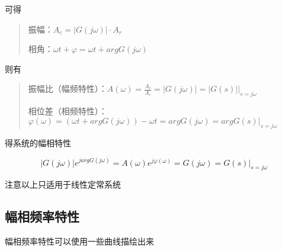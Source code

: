 \documentclass[lang=cn,10pt]{elegantbook}
\begin{document}
可得

\begin{quote}

	\indent 振幅：$A_c=|G(j\omega)|\cdot A_r$

	\indent 相角：$\omega t+\varphi=\omega t+argG(j\omega)$

\end{quote}

则有

\begin{quote}

	\indent 振幅比（幅频特性）：$A(\omega)=\frac{A_c}{A_r}=|G(j\omega)|=|G(s)|\Big|_{s=j\omega}$

	\indent 相位差（相频特性）：$\varphi(\omega)=(\omega t+argG(j\omega))-\omega t=argG(j\omega)=argG(s)\Big|_{s=j\omega}$

\end{quote}

得系统的幅相特性

\begin{equation}
	|G(j\omega)|e^{jargG(j\omega)}=A(\omega)e^{j\varphi(\omega)}=G(j\omega)=G(s)\Big|_{s=j\omega}
\end{equation}

注意以上只适用于线性定常系统

\subsection{幅相频率特性}

幅相频率特性可以使用一些曲线描绘出来
\end{document}
